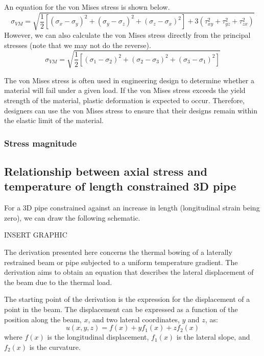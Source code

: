 An equation for the von Mises stress is shown below.
\begin{equation}
    \sigma_{VM} = \sqrt{\frac{1}{2}\left[\left(\sigma_{x}-\sigma_y\right)^2 + \left(\sigma_y - \sigma_z\right)^2+\left(\sigma_z - \sigma_x\right)^2\right] + 3\left(\tau^2_{xy} + \tau^2_{yz}+\tau_{zx}^2\right)}
\end{equation}
However, we can also calculate the von Mises stress directly from the principal stresses (note that we may not do the reverse).
\begin{equation}
    \sigma_{VM} = \sqrt{\frac{1}{2}\left[\left(\sigma_1 - \sigma_2\right)^2 +\left(\sigma_2 - \sigma_3\right)^2 + \left(\sigma_3 - \sigma_1\right)^2 \right]}
\end{equation}

The von Mises stress is often used in engineering design to determine whether a material will fail under a given load. If the von Mises stress exceeds the yield strength of the material, plastic deformation is expected to occur. Therefore, designers can use the von Mises stress to ensure that their designs remain within the elastic limit of the material.
\subsubsection{Stress magnitude}
\subsection{Relationship between axial stress and temperature of length constrained 3D pipe}\label{part1b}
For a 3D pipe constrained against an increase in length (longitudinal strain being zero), we can draw the following schematic.

INSERT GRAPHIC

The derivation presented here concerns the thermal bowing of a laterally restrained beam or pipe subjected to a uniform temperature gradient. The derivation aims to obtain an equation that describes the lateral displacement of the beam due to the thermal load.

The starting point of the derivation is the expression for the displacement of a point in the beam. The displacement can be expressed as a function of the position along the beam, $x$, and two lateral coordinates, $y$ and $z$, as:
\begin{equation}
    u(x,y,z) = f(x) + yf_1(x) + zf_2(x)
\end{equation}
where $f(x)$ is the longitudinal displacement, $f_1(x)$ is the lateral slope, and $f_2(x)$ is the curvature.

